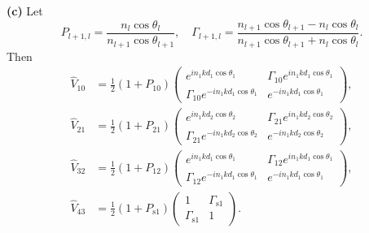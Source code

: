 \documentclass{article}
\makeatletter
\newcommand*{\shifttext}[1]{%
  \settowidth{\@tempdima}{#1}%
  \hspace{-\@tempdima}#1%
}
\newcommand{\plabel}[1]{%
\shifttext{\textbf{#1}\quad}%
}
\makeatother
\begin{document}
\plabel{(c)}%
Let
\[ P_{l+1,l} = \frac{n_{l} \cos \theta_{l}}{n_{l+1} \cos\theta_{l+1}},\quad \Gamma_{l+1,l} = \frac{n_{l+1} \cos \theta_{l+1} - n_l \cos \theta_l}{n_{l+1} \cos \theta_{l+1} + n_{l} \cos \theta_{l}}. \]
Then
\begin{align*}
    \hat{V}_{10} &= \frac{1}{2}(1 + P_{10}) \begin{pmatrix}
        e^{in_1 k d_1 \cos\theta_1} & \Gamma_{10} e^{in_1 k d_1 \cos\theta_1} \\
        \Gamma_{10} e^{-in_1 k d_1 \cos\theta_1} & e^{-in_1 k d_1 \cos\theta_1}
    \end{pmatrix}, \\
    \hat{V}_{21} &= \frac{1}{2}(1 + P_{21}) \begin{pmatrix}
        e^{in_1 k d_2 \cos\theta_2} & \Gamma_{21} e^{in_1 k d_2 \cos\theta_2} \\
        \Gamma_{21} e^{-in_1 k d_2 \cos\theta_2} & e^{-in_1 k d_2 \cos\theta_2}
    \end{pmatrix}, \\
    \hat{V}_{32} &= \frac{1}{2}(1 + P_{12}) \begin{pmatrix}
        e^{in_1 k d_1 \cos\theta_1} & \Gamma_{12} e^{in_1 k d_1 \cos\theta_1} \\
        \Gamma_{12} e^{-in_1 k d_1 \cos\theta_1} & e^{-in_1 k d_1 \cos\theta_1}
    \end{pmatrix}, \\
    \hat{V}_{43} &= \frac{1}{2}(1 + P_{\mathrm{s}1}) \begin{pmatrix}
        1 & \Gamma_{\mathrm{s}1} \\
        \Gamma_{\mathrm{s}1} & 1
    \end{pmatrix}.
\end{align*}
\end{document}
